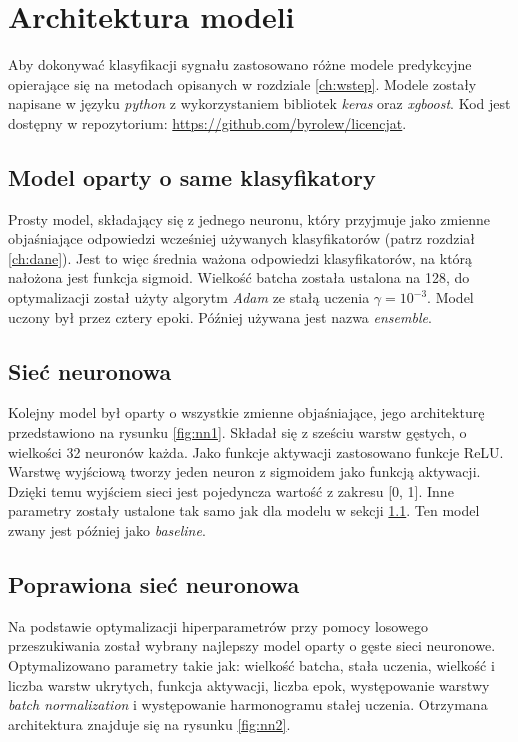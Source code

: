 \documentclass{pracalicmgr}
\begin{document}
		
    \chapter{Architektura modeli}
	Aby dokonywać klasyfikacji sygnału zastosowano różne modele predykcyjne opierające się na metodach opisanych w rozdziale \ref{ch:wstep}. Modele zostały napisane w języku \textit{python} z wykorzystaniem bibliotek \textit{keras} oraz \textit{xgboost}. Kod jest dostępny w repozytorium: \url{https://github.com/byrolew/licencjat}.
	\section{Model oparty o same klasyfikatory}
	\label{sec:mod1}
	Prosty model, składający się z jednego neuronu, który przyjmuje jako zmienne objaśniające odpowiedzi wcześniej używanych klasyfikatorów (patrz rozdział \ref{ch:dane}). Jest to więc średnia ważona odpowiedzi klasyfikatorów, na którą nałożona jest funkcja sigmoid. Wielkość batcha została ustalona na 128, do optymalizacji został użyty algorytm \textit{Adam} ze stałą uczenia $\gamma = 10^{-3}$. Model uczony był przez cztery epoki. Później używana jest nazwa \textit{ensemble}.

	\section{Sieć neuronowa}
	\label{sec:mod2}
	Kolejny model był oparty o wszystkie zmienne objaśniające, jego architekturę przedstawiono na rysunku \ref{fig:nn1}. Składał się z sześciu warstw gęstych, o wielkości 32 neuronów każda. Jako funkcje aktywacji zastosowano funkcje ReLU. Warstwę wyjściową tworzy jeden neuron z sigmoidem jako funkcją aktywacji. Dzięki temu wyjściem sieci jest pojedyncza wartość z zakresu [0, 1]. Inne parametry zostały ustalone tak samo jak dla modelu w sekcji \ref{sec:mod1}. Ten model zwany jest później jako \textit{baseline}.
	
	\section{Poprawiona sieć neuronowa}
	Na podstawie optymalizacji hiperparametrów przy pomocy losowego przeszukiwania został wybrany najlepszy model oparty o gęste sieci neuronowe. Optymalizowano parametry takie jak: wielkość batcha, stała uczenia, wielkość i liczba warstw ukrytych, funkcja aktywacji, liczba epok, występowanie warstwy \textit{batch normalization} i występowanie harmonogramu stałej uczenia. Otrzymana architektura znajduje się na rysunku \ref{fig:nn2}. 
	
\end{document}
